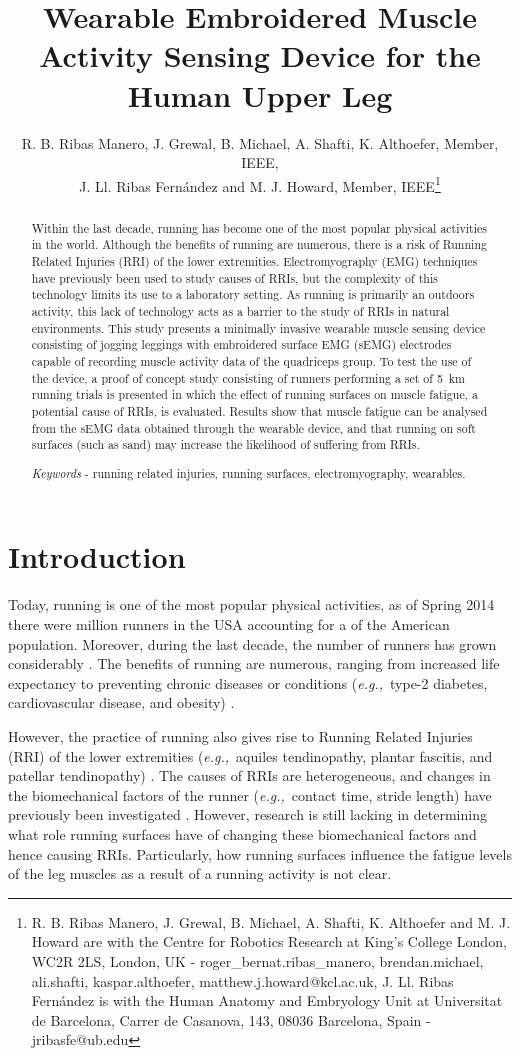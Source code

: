 \documentclass[letterpaper, 10 pt, conference]{ieeeconf}
\title{\LARGE \bf
Wearable Embroidered Muscle Activity Sensing Device for the Human Upper Leg}
\author{R. B. Ribas Manero, J. Grewal, B. Michael, A. Shafti, K. Althoefer, Member, IEEE,\\ J. Ll. Ribas Fern\'{a}ndez and M. J. Howard, Member, IEEE\thanks{R. B. Ribas Manero, J. Grewal, B. Michael, A. Shafti, K. Althoefer and M. J. Howard are with the Centre for Robotics Research at King's College London, WC2R 2LS, London, UK - roger\_bernat.ribas\_manero, brendan.michael, ali.shafti, kaspar.althoefer, matthew.j.howard@kcl.ac.uk,  J. Ll. Ribas Fern\'{a}ndez is with the Human Anatomy and Embryology Unit at Universitat de Barcelona, Carrer de Casanova, 143, 08036 Barcelona, Spain - jribasfe@ub.edu}}
\newcommand{\eg}[1]{\textit{e.g.,}~#1} \newcommand{\ie}[1]{\textit{i.e.,}~#1}
\begin{document}
\maketitle
\thispagestyle{empty}
\pagestyle{empty}


\begin{abstract}
Within the last decade, running has become one of the most popular physical
activities in the world. Although the benefits of running are numerous, there
is a risk of Running Related Injuries (RRI) of the lower extremities.
Electromyography (EMG) techniques have previously been used to  study causes of
RRIs, but the complexity of this technology limits its use to a laboratory
setting. As running is primarily an outdoors activity, this lack of technology
acts as a barrier to the study of RRIs in natural environments. This study
presents a minimally invasive wearable muscle sensing device consisting of
jogging leggings with embroidered surface EMG (sEMG) electrodes capable of
recording muscle activity data of the quadriceps group. To test the use of the
device, a proof of concept study consisting of  runners performing a set
of \SI{5}{\kilo\meter} running trials is presented in which the effect of
running surfaces on muscle fatigue, a potential cause of RRIs, is evaluated.
Results show that muscle fatigue can be analysed from the sEMG data obtained
through the wearable device, and that running on soft surfaces (such as sand)
may increase the likelihood of suffering from RRIs.

\emph{Keywords} - running related injuries, running surfaces, electromyography,
wearables.
\end{abstract}

\section{Introduction}\label{s:introduction}
Today, running is one of the most popular physical activities, as of Spring
2014 there were  million runners in the USA accounting for a 
of the American population. Moreover, during the last decade, the number of
runners has grown considerably \cite{paluska2005overview}. The benefits of
running are numerous, ranging from increased life expectancy to preventing
chronic diseases or conditions (\eg{type-2 diabetes, cardiovascular disease,
and obesity}) \cite{o2010abc}. 

However, the practice of running also gives rise to Running Related Injuries
(RRI) of the lower extremities (\eg{aquiles tendinopathy, plantar fascitis, and
patellar tendinopathy}) \cite{van1992running}. The causes of RRIs are
heterogeneous, and changes in the biomechanical factors of the runner
(\eg{contact time, stride length}) have previously been investigated \cite{pinnington2005kinematic}. However, research is still lacking in
determining what role running surfaces have of changing these biomechanical
factors and hence causing RRIs. Particularly, how running surfaces influence
the fatigue levels of the leg muscles as a result of a running activity is not
clear. 
\end{document}
